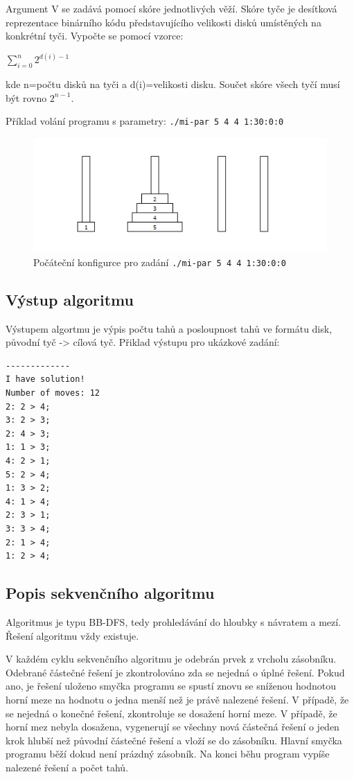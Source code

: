 \documentclass[12pt]{article}
\begin{document}
Argument V se zadává pomocí skóre jednotlivých věží. Skóre tyče je desítková reprezentace binárního kódu představujícího velikosti disků umístěných na konkrétní tyči. Vypočte se pomocí vzorce:
\begin{center}
$\displaystyle\sum\limits_{i=0}^n {2^{d(i)-1}}$
\end{center}
 kde n=počtu disků na tyči a d(i)=velikosti disku. Součet skóre všech tyčí musí být rovno $2^{n-1}$.

Příklad volání programu s parametry:
\texttt{./mi-par 5 4 4 1:30:0:0}

\begin{figure}[h]
\begin{center}
\includegraphics[width=140mm]{5-4-4.png}
\caption{Počáteční konfigurce pro zadání \texttt{./mi-par 5 4 4 1:30:0:0}}
\end{center}
\end{figure}



\subsection{Výstup algoritmu}
Výstupem algortmu je výpis počtu tahů a posloupnost tahů ve formátu disk, původní tyč -> cílová tyč.
Přiklad výstupu pro ukázkové zadání:

\begin{verbatim}
-------------
I have solution!
Number of moves: 12
2: 2 > 4;
3: 2 > 3;
2: 4 > 3;
1: 1 > 3;
4: 2 > 1;
5: 2 > 4;
1: 3 > 2;
4: 1 > 4;
2: 3 > 1;
3: 3 > 4;
2: 1 > 4;
1: 2 > 4;
\end{verbatim}
\subsection{Popis sekvenčního algoritmu}
Algoritmus je typu BB-DFS, tedy prohledávání do hloubky s návratem a mezí.
Řešení algoritmu vždy existuje. 

V každém cyklu sekvenčního algoritmu je odebrán prvek z vrcholu zásobníku.
Odebrané částečné řešení je zkontrolováno zda se nejedná o úplné řešení. Pokud
ano, je řešení uloženo smyčka programu se spustí znovu se sníženou hodnotou
horní meze na hodnotu o jedna menší než je právě nalezené řešení. V případě, že
se nejedná o konečné řešení, zkontroluje se dosažení horní meze. V případě, že
horní mez nebyla dosažena, vygenerují se všechny nová částečná řešení o jeden
krok hlubší než původní částečné řešení a vloží se do zásobníku. Hlavní smyčka
programu běží dokud není prázdný zásobník. Na konci běhu program vypíše nalezené
řešení a počet tahů.
\end{document}
